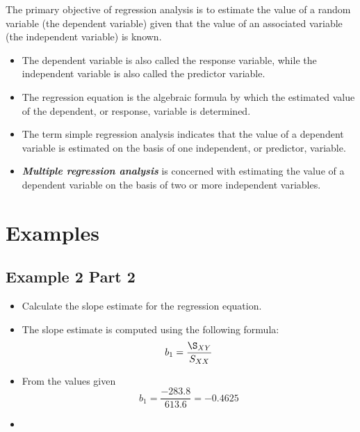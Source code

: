 \documentclass[]{report}
\begin{document}
The primary objective of regression analysis is to estimate the value of a random variable (the dependent
variable) given that the value of an associated variable (the independent variable) is known. 

\begin{itemize}
	\item The dependent
	variable is also called the response variable, while the independent variable is also called the predictor
	variable. 
	
	\item The regression equation is the algebraic formula by which the estimated value of the dependent, or
	response, variable is determined.
	\item The term simple regression analysis indicates that the value of a dependent variable is estimated on the
	basis of one independent, or predictor, variable.
	
	\item \textit{\textbf{Multiple regression analysis}} is
	concerned with estimating the value of a dependent variable on the basis of two or more independent variables.
\end{itemize}



\section{Examples}









\subsection{Example 2 Part 2}
\begin{itemize}
	\item Calculate the slope estimate for the regression equation.
	\item The slope estimate is computed using the following formula:
	\[ b_1 = \frac{\S_{XY}}{S_{XX}} \]
	\item From the values given
	\[ b_1 = \frac{-283.8}{613.6} =-0.4625 \]
	\item 
\end{itemize}
\end{document}
